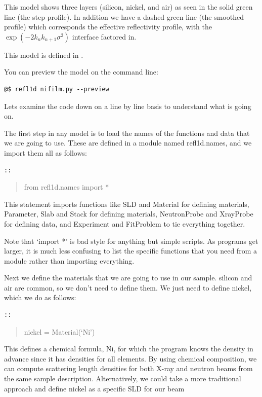 \documentclass[letterpaper,10pt,english]{sphinxmanual}
\begin{document}
This model shows three layers (silicon, nickel, and air) as seen in the
solid green line (the step profile).  In addition we have a dashed green
line (the smoothed profile) which corresponds the effective reflectivity
profile, with the $\exp(-2 k_n k_{n+1} \sigma^2)$ interface factored in.

This model is defined in .

You can preview the model on the command line:

\begin{Verbatim}[commandchars=@\[\]]
@$ refl1d nifilm.py --preview
\end{Verbatim}

Lets examine the code down on a line by line basis to understand what is
going on.

The first step in any model is to load the names of the functions and
data that we are going to use.  These are defined in a module named
refl1d.names, and we import them all as follows:

\begin{Verbatim}[commandchars=@\[\]]
::
\end{Verbatim}
\begin{quote}

from refl1d.names import *
\end{quote}

This statement imports functions like SLD and Material for defining
materials, Parameter, Slab and Stack for defining materials,
NeutronProbe and XrayProbe for defining data, and Experiment and
FitProblem to tie everything together.

Note that `import *' is bad style for anything but simple scripts.  As
programs get larger, it is much less confusing to list the specific
functions that you need from a module rather than importing everything.

Next we define the materials that we are going to use in our sample.
silicon and air are common, so we don't need to define them.  We just
need to define nickel, which we do as follows:

\begin{Verbatim}[commandchars=@\[\]]
::
\end{Verbatim}
\begin{quote}

nickel = Material(`Ni')
\end{quote}

This defines a chemical formula, Ni, for which the program knows the
density in advance since it has densities for all elements.  By using
chemical composition, we can compute scattering length densities for
both X-ray and neutron beams from the same sample description.
Alternatively, we could take a more traditional approach and define
nickel as a specific SLD for our beam
\end{document}
